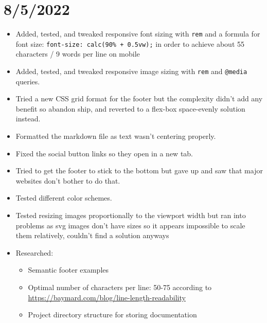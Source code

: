 \documentclass{article}
\begin{document}
\section*{8/5/2022}
\begin{itemize}
	\item Added, tested, and tweaked responsive font sizing with \texttt{rem} and a formula for font size: \texttt{font-size: calc(90\% + 0.5vw);} in order to achieve about 55 characters / 9 words per line on mobile
	\item Added, tested, and tweaked responsive image sizing with \texttt{rem} and \texttt{@media} queries. 
	\item Tried a new CSS grid format for the footer but the complexity didn't add any benefit so abandon ship, and reverted to a flex-box space-evenly solution instead.
	\item Formatted the markdown file as text wasn't centering properly.
	\item Fixed the social button links so they open in a new tab.
	\item Tried to get the footer to stick to the bottom but gave up and saw that major websites don't bother to do that.
	\item Tested different color schemes.
	\item Tested resizing images proportionally to the viewport width but ran into problems as svg images don't have sizes so it appears impossible to scale them relatively, couldn't find a solution anyways
	\item Researched:
		\begin{itemize} 
	 			\item Semantic footer examples
	 			\item Optimal number of characters per line: 50-75 according to \href{https://baymard.com/blog/line-length-readability}{https://baymard.com/blog/line-length-readability}
	 			\item Project directory structure for storing documentation
		\end{itemize}
\end{itemize}
\end{document}
